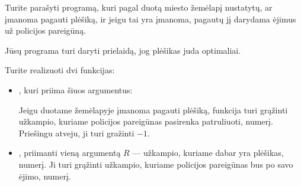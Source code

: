 \documentclass{boi2014-lt}
\begin{document}
    \Task
	Turite parašyti programą, kuri pagal duotą miesto žemėlapį nustatytų,
	ar įmanoma pagauti plėšiką, ir jeigu tai yra įmanoma, pagautų jį
	darydama ėjimus už policijos pareigūną.

	Jūsų programa turi daryti prielaidą, jog plėšikas juda optimaliai.

    \Implementation
    Turite realizuoti dvi funkcijas:
    \begin{itemize}
        \item {}, kuri priima šiuos argumentus:

		Jeigu duotame žemėlapyje įmanoma pagauti plėšiką, funkcija 
		turi grąžinti užkampio, kuriame policijos pareigūnas pasirenka
		patruliuoti, numerį. Priešingu atveju, ji turi gražinti $-1$.

		\item {}, priimanti vieną argumentą $R$ --- užkampio,
			kuriame dabar yra plėšikas, numerį. Ji turi grąžinti užkampio,
			kuriame policijos pareigūnas bus po savo ėjimo, numerį.
    \end{itemize}
\end{document}
